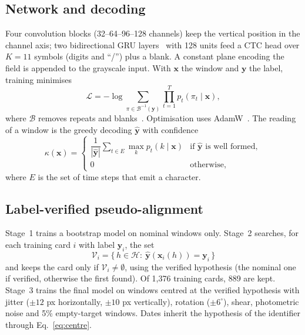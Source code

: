 \documentclass[11pt,a4paper]{article}
\begin{document}
\subsection{Network and decoding}
Four convolution blocks (32--64--96--128 channels) keep the vertical position in the channel axis; two bidirectional GRU layers~\cite{cho2014gru} with 128 units feed a CTC head over $K=11$ symbols (digits and ``/'') plus a blank. A constant plane encoding the field is appended to the grayscale input. With $\mathbf{x}$ the window and $\mathbf{y}$ the label, training minimises
\begin{equation}
\mathcal{L}=-\log\sum_{\pi\in\mathcal{B}^{-1}(\mathbf{y})}\prod_{t=1}^{T}p_t(\pi_t\mid\mathbf{x}),
\end{equation}
where $\mathcal{B}$ removes repeats and blanks~\cite{graves2006ctc}. Optimisation uses AdamW~\cite{loshchilov2019adamw}. The reading of a window is the greedy decoding $\hat{\mathbf{y}}$ with confidence
\begin{equation}
\kappa(\mathbf{x})=\begin{cases}\dfrac{1}{|\hat{\mathbf{y}}|}\sum_{t\in E}\max_k p_t(k\mid\mathbf{x}) & \text{if }\hat{\mathbf{y}}\text{ is well formed},\\[1ex] 0 & \text{otherwise},\end{cases}
\end{equation}
where $E$ is the set of time steps that emit a character.

\subsection{Label-verified pseudo-alignment}\label{sec:align}
Stage~1 trains a bootstrap model on nominal windows only. Stage~2 searches, for each training card $i$ with label $\mathbf{y}_i$, the set
\begin{equation}
\mathcal{V}_i=\{\,h\in\mathcal{H}:\ \hat{\mathbf{y}}(\mathbf{x}_i(h))=\mathbf{y}_i\,\}
\end{equation}
and keeps the card only if $\mathcal{V}_i\neq\emptyset$, using the verified hypothesis (the nominal one if verified, otherwise the first found). Of 1{,}376 training cards, 889 are kept. Stage~3 trains the final model on windows centred at the verified hypothesis with jitter ($\pm12$ px horizontally, $\pm10$ px vertically), rotation ($\pm6^\circ$), shear, photometric noise and 5\% empty-target windows. Dates inherit the hypothesis of the identifier through Eq.~\eqref{eq:centre}.
\end{document}
